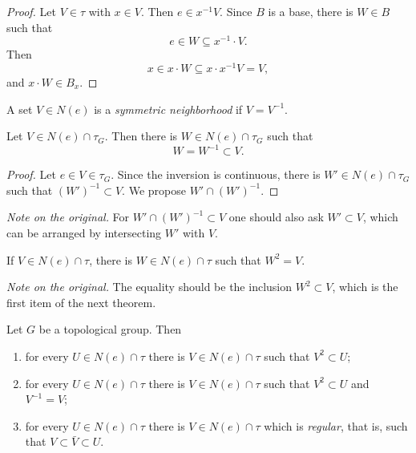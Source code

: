 \begin{proof}
Let $V\in\tau$ with $x\in V$. Then
$e\in x^{-1}V$. Since $B$ is a base,
there is $W\in B$ such that
$$
e\in W\subseteq x^{-1}\cdot V.
$$
Then
$$
x\in x\cdot W
\subseteq x\cdot x^{-1}V=V,
$$
and $x\cdot W\in B_x$.
\end{proof}

\begin{definition}
\label{definition-symmetric-neighborhood}
A set $V\in N(e)$ is a
{\it symmetric neighborhood} if
$V=V^{-1}$.
\end{definition}

\begin{proposition}
\label{proposition-symmetric-neighborhood}
Let $V\in N(e)\cap\tau_G$. Then there is
$W\in N(e)\cap\tau_G$ such that
$$
W=W^{-1}\subset V.
$$
\end{proposition}

\begin{proof}
Let $e\in V\in\tau_G$. Since the
inversion is continuous, there is
$W'\in N(e)\cap\tau_G$ such that
$(W')^{-1}\subset V$. We propose
$W'\cap(W')^{-1}$.
\end{proof}

\noindent
{\it Note on the original.} For
$W'\cap(W')^{-1}\subset V$ one should
also ask $W'\subset V$, which can be
arranged by intersecting $W'$ with $V$.

\begin{remark}
\label{remark-square-root-neighborhood}
If $V\in N(e)\cap\tau$, there is
$W\in N(e)\cap\tau$ such that $W^2=V$.
\end{remark}

\noindent
{\it Note on the original.} The equality
should be the inclusion $W^2\subset V$,
which is the first item of the next
theorem.

\begin{theorem}
\label{theorem-neighborhoods-of-identity}
Let $G$ be a topological group. Then
\begin{enumerate}
\item for every $U\in N(e)\cap\tau$
there is $V\in N(e)\cap\tau$ such that
$V^2\subset U$;
\item for every $U\in N(e)\cap\tau$
there is $V\in N(e)\cap\tau$ such that
$V^2\subset U$ and $V^{-1}=V$;
\item for every $U\in N(e)\cap\tau$
there is $V\in N(e)\cap\tau$ which is
{\it regular}, that is, such that
$V\subset\bar{V}\subset U$.
\end{enumerate}
\end{theorem}

